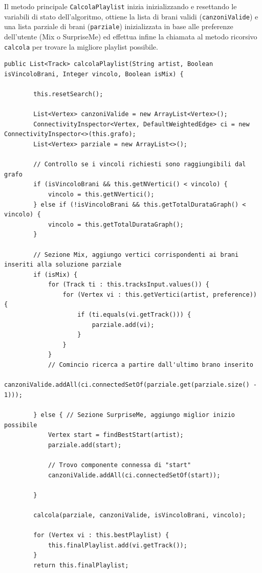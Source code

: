 \documentclass[12pt, a4paper]{article}
\begin{document}
Il metodo principale \texttt{CalcolaPlaylist} inizia inizializzando e resettando le variabili di stato dell'algoritmo, ottiene la lista di brani validi (\texttt{canzoniValide}) e una lista parziale di brani (\texttt{parziale}) inizializzata in base alle preferenze dell'utente (Mix o SurpriseMe) ed effettua infine la chiamata al metodo ricorsivo \texttt{calcola} per trovare la migliore playlist possibile.

\begin{lstlisting}
public List<Track> calcolaPlaylist(String artist, Boolean isVincoloBrani, Integer vincolo, Boolean isMix) {

		this.resetSearch();

		List<Vertex> canzoniValide = new ArrayList<Vertex>();
		ConnectivityInspector<Vertex, DefaultWeightedEdge> ci = new ConnectivityInspector<>(this.grafo);
		List<Vertex> parziale = new ArrayList<>();

		// Controllo se i vincoli richiesti sono raggiungibili dal grafo
		if (isVincoloBrani && this.getNVertici() < vincolo) {
			vincolo = this.getNVertici();
		} else if (!isVincoloBrani && this.getTotalDurataGraph() < vincolo) {
			vincolo = this.getTotalDurataGraph();
		}

		// Sezione Mix, aggiungo vertici corrispondenti ai brani inseriti alla soluzione parziale
		if (isMix) {
			for (Track ti : this.tracksInput.values()) {
				for (Vertex vi : this.getVertici(artist, preference)) {
					if (ti.equals(vi.getTrack())) {
						parziale.add(vi);
					}
				}
			}
			// Comincio ricerca a partire dall'ultimo brano inserito
			canzoniValide.addAll(ci.connectedSetOf(parziale.get(parziale.size() - 1)));

		} else { // Sezione SurpriseMe, aggiungo miglior inizio possibile
			Vertex start = findBestStart(artist);
			parziale.add(start);

			// Trovo componente connessa di "start"
			canzoniValide.addAll(ci.connectedSetOf(start));

		}

		calcola(parziale, canzoniValide, isVincoloBrani, vincolo);

		for (Vertex vi : this.bestPlaylist) {
			this.finalPlaylist.add(vi.getTrack());
		}
		return this.finalPlaylist;
\end{lstlisting}
\end{document}
